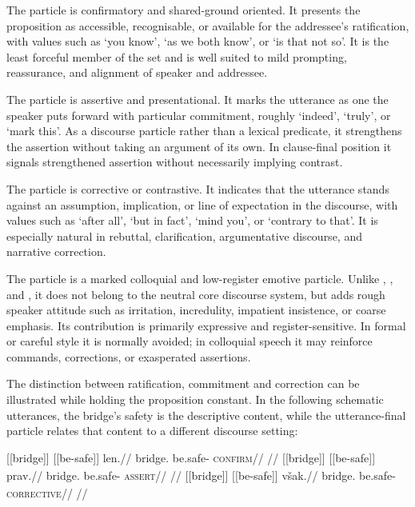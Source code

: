 \noindent\textit{}\quad  The particle  is confirmatory and shared-ground
oriented. It presents the proposition as accessible, recognisable, or available
for the addressee's ratification, with values such as `you know', `as we both
know', or `is that not so'. It is the least forceful member of the set and is
well suited to mild prompting, reassurance, and alignment of speaker and
addressee.

\noindent\textit{}\quad  The particle  is assertive and presentational.
It marks the utterance as one the speaker puts forward with particular
commitment, roughly `indeed', `truly', or `mark this'. As a discourse particle
rather than a lexical predicate, it strengthens the assertion without taking an
argument of its own. In
clause-final position it signals strengthened assertion without necessarily
implying contrast.

\noindent\textit{}\quad  The particle  is corrective or contrastive. It
indicates that the utterance stands against an assumption, implication, or line
of expectation in the discourse, with values such as `after all', `but in fact',
`mind you', or `contrary to that'. It is especially natural in rebuttal,
clarification, argumentative discourse, and narrative correction.

\noindent\textit{}\quad  The particle  is a marked colloquial and
low-register emotive particle. Unlike , , and , it
does not belong to the neutral core discourse system, but adds rough speaker
attitude such as irritation, incredulity, impatient insistence, or coarse
emphasis. Its contribution is primarily expressive and register-sensitive. In
formal or careful style it is normally avoided; in colloquial speech it may
reinforce commands, corrections, or exasperated assertions.

The distinction between ratification, commitment and correction can be
illustrated while holding the proposition constant. In the following
schematic utterances, the bridge's safety is the descriptive content, while
the utterance-final particle relates that content to a different discourse
setting:

\pex\label{ex:discourse-slot-bridge}
\a
\begingl
\gla \textnormal{[[bridge]]}\textsubscript{\Dir{}} \textnormal{[[be-safe]]}\textsubscript{\Cont{}} len.//
\glb bridge.\Dir{} be.safe-\Cont{} \textsc{confirm}//
\glft {}
//
\endgl
\a
\begingl
\gla \textnormal{[[bridge]]}\textsubscript{\Dir{}} \textnormal{[[be-safe]]}\textsubscript{\Cont{}} prav.//
\glb bridge.\Dir{} be.safe-\Cont{} \textsc{assert}//
\glft {}
//
\endgl
\a
\begingl
\gla \textnormal{[[bridge]]}\textsubscript{\Dir{}} \textnormal{[[be-safe]]}\textsubscript{\Cont{}} však.//
\glb bridge.\Dir{} be.safe-\Cont{} \textsc{corrective}//
\glft {}
//
\endgl
\xe

